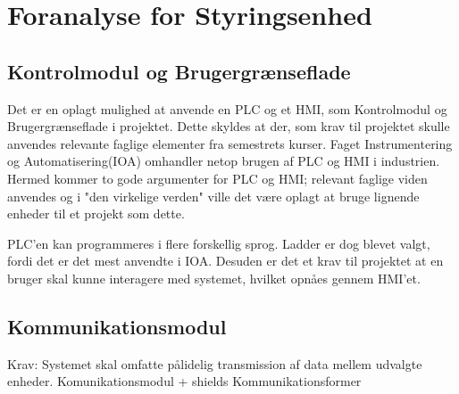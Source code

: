 
\section{Foranalyse for Styringsenhed}

\subsection{Kontrolmodul og Brugergrænseflade}
Det er en oplagt mulighed at anvende en PLC og et HMI, som Kontrolmodul og Brugergrænseflade i projektet. Dette skyldes at der, som krav til projektet skulle anvendes relevante faglige elementer fra semestrets kurser. Faget Instrumentering og Automatisering(IOA) omhandler netop brugen af PLC og HMI i industrien. Hermed kommer to gode argumenter for PLC og HMI; relevant faglige viden anvendes og i "den virkelige verden" ville det være oplagt at bruge lignende enheder til et projekt som dette.

PLC'en kan programmeres i flere forskellig sprog. Ladder er dog blevet valgt, fordi det er det mest anvendte i IOA. Desuden er det et krav til projektet at en bruger skal kunne interagere med systemet, hvilket opnåes gennem HMI'et.

\subsection{Kommunikationsmodul}
Krav: Systemet skal omfatte pålidelig transmission af data mellem udvalgte enheder.
Komunikationsmodul + shields
Kommunikationsformer


